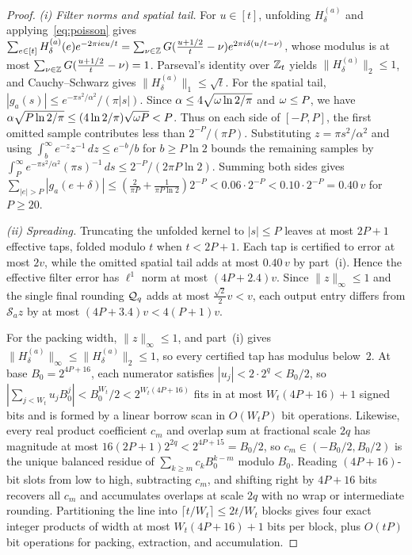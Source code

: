 \begin{proof}
\emph{(i) Filter norms and spatial tail.} For $u\in[t]$, unfolding $H^{(a)}_\delta$ and applying~\eqref{eq:poisson}
gives $\sum_{e\in[t]}H^{(a)}_\delta(e)e^{-2\pi i eu/t}=\sum_{\nu\in\mathbb{Z}}G(\frac{u+1/2}{t}-\nu)e^{2\pi i\delta(u/t-\nu)}$,
whose modulus is at most $\sum_{\nu\in\mathbb{Z}}G(\frac{u+1/2}{t}-\nu)=1$. Parseval's identity over $\mathbb{Z}_t$ yields
$\|H^{(a)}_\delta\|_2\le 1$, and Cauchy--Schwarz gives $\|H^{(a)}_\delta\|_1\le\sqrt{t}$. For the spatial tail,
$|g_a(s)|\le e^{-\pi s^2/\alpha^2}/(\pi|s|)$. Since $\alpha\le 4\sqrt{\omega\ln 2/\pi}$ and $\omega\le P$, we have
$\alpha\sqrt{P\ln 2/\pi}\le(4\ln 2/\pi)\sqrt{\omega P}<P$. Thus on each side of $[-P,P]$, the first omitted sample
contributes less than $2^{-P}/(\pi P)$. Substituting $z=\pi s^2/\alpha^2$ and using
$\int_b^\infty e^{-z}z^{-1}\,dz\le e^{-b}/b$ for $b\ge P\ln 2$ bounds the remaining samples by
$\int_P^\infty e^{-\pi s^2/\alpha^2}(\pi s)^{-1}\,ds\le 2^{-P}/(2\pi P\ln 2)$. Summing both sides gives
$\sum_{|e|>P}|g_a(e+\delta)|\le(\frac{2}{\pi P}+\frac{1}{\pi P\ln 2})2^{-P}<0.06\cdot 2^{-P}<0.10\cdot 2^{-P}=0.40\,v$
for $P\ge 20$.

\emph{(ii) Spreading.} Truncating the unfolded kernel to $|s|\le P$ leaves at most $2P+1$ effective taps, folded modulo
$t$ when $t<2P+1$. Each tap is certified to error at most $2v$, while the omitted spatial tail adds at most $0.40\,v$
by part~(i). Hence the effective filter error has $\ell^1$ norm at most $(4P+2.4)v$. Since $\|z\|_\infty\le 1$ and the
single final rounding $\mathcal{Q}_q$ adds at most $\frac{\sqrt2}{2}v<v$, each output entry differs from $\mathcal S_a z$ by
at most $(4P+3.4)v<4(P+1)v$.

For the packing width, $\|z\|_\infty\le 1$, and part~(i) gives $\|H^{(a)}_\delta\|_\infty\le\|H^{(a)}_\delta\|_2\le 1$,
so every certified tap has modulus below~$2$. At base $B_0=2^{4P+16}$, each numerator satisfies
$|u_j|<2\cdot 2^q<B_0/2$, so $|\sum_{j<W_t}u_j B_0^j|<B_0^{W_t}/2<2^{W_t(4P+16)}$ fits in at most $W_t(4P+16)+1$ signed
bits and is formed by a linear borrow scan in $O(W_t P)$ bit operations. Likewise, every real product coefficient $c_m$
and overlap sum at fractional scale $2q$ has magnitude at most $16(2P+1)2^{2q}<2^{4P+15}=B_0/2$, so
$c_m\in(-B_0/2,B_0/2)$ is the unique balanced residue of $\sum_{k\ge m}c_k B_0^{k-m}$ modulo $B_0$. Reading
$(4P+16)$-bit slots from low to high, subtracting $c_m$, and shifting right by $4P+16$ bits recovers all $c_m$ and
accumulates overlaps at scale $2q$ with no wrap or intermediate rounding. Partitioning the line into
$\lceil t/W_t\rceil\le 2t/W_t$ blocks gives four exact integer products of width at most $W_t(4P+16)+1$ bits per block,
plus $O(tP)$ bit operations for packing, extraction, and accumulation.


\end{proof}
